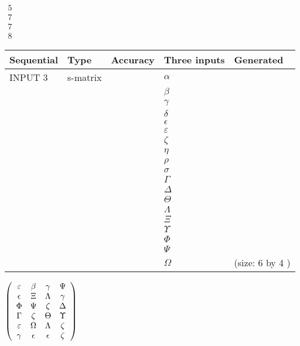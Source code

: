 \documentclass[12pt]{article}
\begin{document}
   
 $\begin{array}{
 c
 }
 5  \\ 
 7  \\ 
 7  \\ 
 8
\end{array}  $ 
  
  
\noindent\begin{tabular}{|l|l|l|l|l|}
\hline
 Sequential & Type & Accuracy & Three inputs & Generated \\ 
\hline
 
 
  INPUT $  3 $ & s-matrix & & 
 $  \alpha $ & 
  \\
  & & & 
 $  \beta $ & 
  \\
  & & & 
 $  \gamma $ & 
  \\
  & & & 
 $  \delta $ & 
  \\
  & & & 
 $  \epsilon $ & 
  \\
  & & & 
 $  \varepsilon $ & 
  \\
  & & & 
 $                     \zeta $ & 
  \\
  & & & 
 $  \eta $ & 
  \\
  & & & 
 $  \rho $ & 
  \\
  & & & 
 $  \sigma $ & 
  \\
  & & & 
 $  \Gamma $ & 
  \\
  & & & 
 $  \Delta $ & 
  \\
  & & & 
 $  \Theta $ & 
  \\
  & & & 
 $  \Lambda $ & 
  \\
  & & & 
 $                     \Xi $ & 
  \\
  & & & 
 $  \Upsilon $ & 
  \\
  & & & 
 $  \Phi $ & 
  \\
  & & & 
 $  \Psi $ & 
  \\
  & & & 
 $  \Omega $ & 
  (size:  6  by  4 )
 \\  \hline  
 \end{tabular}
   
   
 $  \left( \begin{array}
 {
 c
 c
 c
 c
 }
 \varepsilon & 
 \beta & 
 \gamma & 
 \Psi \\ 
 \epsilon & 
                    \Xi & 
 \Lambda & 
 \gamma \\ 
 \Phi & 
 \Psi & 
                    \zeta & 
 \Delta \\ 
 \Gamma & 
                    \zeta & 
 \Theta & 
 \Upsilon \\ 
 \varepsilon & 
 \Omega & 
 \Lambda & 
                    \zeta \\ 
 \gamma & 
 \epsilon & 
 \epsilon & 
                    \zeta
 \end{array} \right) $ 
  
\end{document}
